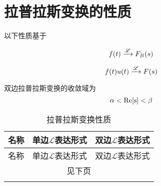 \documentclass[cn,11pt,chinese,black,simple]{../elegantbook}
\begin{document}
\section{拉普拉斯变换的性质}


以下性质基于 

\[
f(t) \xrightarrow{\mathscr{L}} F_B(s)    
\]

\[
f(t)u(t) \xrightarrow{\mathscr{L}} F(s)    
\]

双边拉普拉斯变换的收敛域为 \[\alpha < \operatorname{Re}[\mathrm{s}] < \beta\]


\begin{longtable}{lll} 
    \caption{拉普拉斯变换性质} \\ 
    \toprule
    名称 & 单边\(\mathscr{L}\)表达形式  & 双边\(\mathscr{L}\)表达形式 \\  
    \midrule
    \endfirsthead
    
    \toprule
    名称 & 单边\(\mathscr{L}\)表达形式  & 双边\(\mathscr{L}\)表达形式 \\  
    \midrule
    \endhead 
  
    \hline
    \multicolumn{3}{c}{见下页}\\   \bottomrule
    \endfoot

    \bottomrule
    \endlastfoot
  

\end{longtable}
\end{document}
